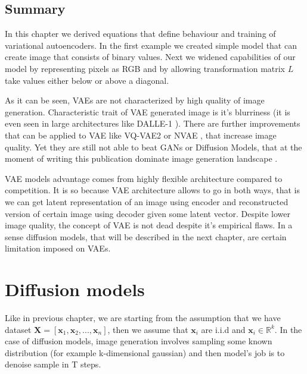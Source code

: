 \documentclass[10pt]{article}
\begin{document}
\subsection{Summary}
In this chapter we derived equations that define behaviour and training of variational autoencoders. In the first example we created simple model that can create image that consists of binary values. Next we widened capabilities of our model by representing pixels as RGB and by allowing transformation matrix $L$ take values either below or above a diagonal.

As it can be seen, VAEs are not characterized by high quality of image generation. Characteristic trait of VAE generated image is it's blurriness (it is even seen in large architectures like DALLE-1 \cite{dalle_1}). There are further improvements that can be applied to VAE like  VQ-VAE2 \cite{VQ_VAE2} or NVAE \cite{NVAE}, that increase image quality. Yet they are still not able to beat GANs or Diffusion Models, that at the moment of writing this publication dominate image generation landscape \cite{ranking}.

VAE models advantage comes from highly flexible architecture compared to competition. It is so because VAE architecture allows to go in both ways, that is we can get latent representation of an image using encoder and reconstructed version of certain image using decoder given some latent vector. Despite lower image quality, the concept of VAE is not dead despite it's empirical flaws. In a sense diffusion models, that will be described in the next chapter, are certain limitation imposed on VAEs.

\section{Diffusion models}
Like in previous chapter, we are starting from the assumption that we have dataset 
 $\textbf{X} = [\textbf{x}_{1} , \textbf{x}_{2}, ... ,\textbf{x}_{n}]$, then we assume that $\textbf{x}_{i}$ are i.i.d  and $\textbf{x}_{i} \in \mathbb{R}^{k}$. In the case of diffusion models,
 image generation involves sampling some known distribution (for example k-dimensional gaussian) and then model's job is to denoise sample in T steps.
\end{document}
